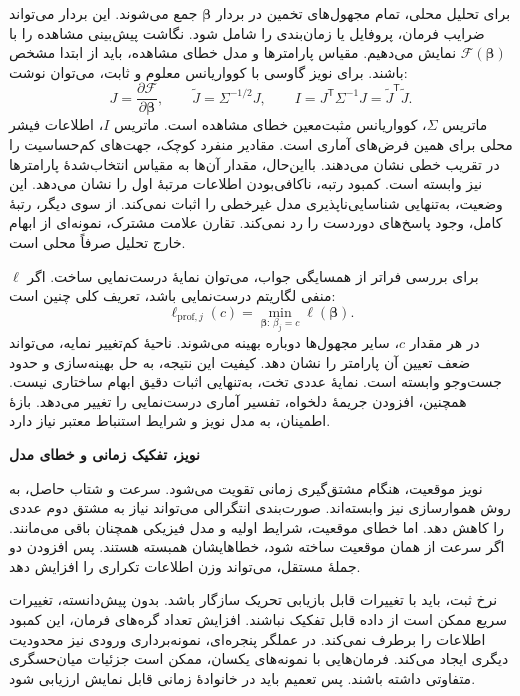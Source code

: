 برای تحلیل محلی، تمام مجهول‌های تخمین در بردار $\boldsymbol\beta$ جمع می‌شوند.
این بردار می‌تواند ضرایب فرمان، پروفایل یا زمان‌بندی را شامل شود.
نگاشت پیش‌بینی مشاهده را با $\mathcal F(\boldsymbol\beta)$ نمایش می‌دهیم.
مقیاس پارامترها و مدل خطای مشاهده، باید از ابتدا مشخص باشند.
برای نویز گاوسی با کوواریانس معلوم و ثابت، می‌توان نوشت:
\begin{equation}
J=\frac{\partial\mathcal F}{\partial\boldsymbol\beta},
\qquad
\widetilde J=\Sigma^{-1/2}J,
\qquad
I=J^{\mathsf T}\Sigma^{-1}J
=\widetilde J^{\mathsf T}\widetilde J.
\label{eq:lit-identifiability-sensitivity}
\end{equation}
ماتریس $\Sigma$، کوواریانس مثبت‌معین خطای مشاهده است.
ماتریس $I$، اطلاعات فیشر محلی برای همین فرض‌های آماری است.
مقادیر منفرد کوچک، جهت‌های کم‌حساسیت را در تقریب خطی نشان می‌دهند.
بااین‌حال، مقدار آن‌ها به مقیاس انتخاب‌شدهٔ پارامترها نیز وابسته است.
کمبود رتبه، ناکافی‌بودن اطلاعات مرتبهٔ اول را نشان می‌دهد.
این وضعیت، به‌تنهایی شناسایی‌ناپذیری مدل غیرخطی را اثبات نمی‌کند.
از سوی دیگر، رتبهٔ کامل، وجود پاسخ‌های دوردست را رد نمی‌کند.
تقارن علامت مشترک، نمونه‌ای از ابهام خارج تحلیل صرفاً محلی است.

برای بررسی فراتر از همسایگی جواب، می‌توان نمایهٔ درست‌نمایی ساخت.
اگر $\ell$ منفی لگاریتم درست‌نمایی باشد، تعریف کلی چنین است:
\begin{equation}
\ell_{\mathrm{prof},j}(c)
=\min_{\boldsymbol\beta:\,\beta_j=c}
\ell(\boldsymbol\beta).
\label{eq:lit-identifiability-profile}
\end{equation}
در هر مقدار $c$، سایر مجهول‌ها دوباره بهینه می‌شوند.
ناحیهٔ کم‌تغییر نمایه، می‌تواند ضعف تعیین آن پارامتر را نشان دهد.
کیفیت این نتیجه، به حل بهینه‌سازی و حدود جست‌وجو وابسته است.
نمایهٔ عددی تخت، به‌تنهایی اثبات دقیق ابهام ساختاری نیست.
همچنین، افزودن جریمهٔ دلخواه، تفسیر آماری درست‌نمایی را تغییر می‌دهد.
بازهٔ اطمینان، به مدل نویز و شرایط استنباط معتبر نیاز دارد.

\textbf{نویز، تفکیک زمانی و خطای مدل}

نویز موقعیت، هنگام مشتق‌گیری زمانی تقویت می‌شود.
سرعت و شتاب حاصل، به روش هموارسازی نیز وابسته‌اند.
صورت‌بندی انتگرالی می‌تواند نیاز به مشتق دوم عددی را کاهش دهد.
اما خطای موقعیت، شرایط اولیه و مدل فیزیکی همچنان باقی می‌مانند.
اگر سرعت از همان موقعیت ساخته شود، خطاهایشان همبسته هستند.
پس افزودن دو جملهٔ مستقل، می‌تواند وزن اطلاعات تکراری را افزایش دهد.

نرخ ثبت، باید با تغییرات قابل بازیابی تحریک سازگار باشد.
بدون پیش‌دانسته، تغییرات سریع ممکن است از داده قابل تفکیک نباشند.
افزایش تعداد گره‌های فرمان، این کمبود اطلاعات را برطرف نمی‌کند.
در عملگر پنجره‌ای، نمونه‌برداری ورودی نیز محدودیت دیگری ایجاد می‌کند.
فرمان‌هایی با نمونه‌های یکسان، ممکن است جزئیات میان‌حسگری متفاوتی داشته باشند.
پس تعمیم باید در خانوادهٔ زمانی قابل نمایش ارزیابی شود.

